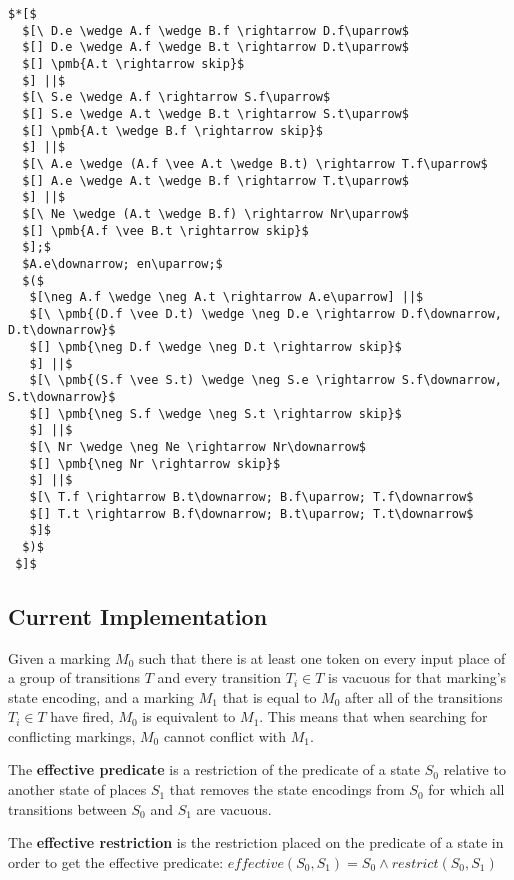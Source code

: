 \begin{lstlisting}[caption={PCFB One Bit Constant Time Accumulator}]
$*[$
  $[\ D.e \wedge A.f \wedge B.f \rightarrow D.f\uparrow$
  $[] D.e \wedge A.f \wedge B.t \rightarrow D.t\uparrow$
  $[] \pmb{A.t \rightarrow skip}$
  $] ||$
  $[\ S.e \wedge A.f \rightarrow S.f\uparrow$
  $[] S.e \wedge A.t \wedge B.t \rightarrow S.t\uparrow$
  $[] \pmb{A.t \wedge B.f \rightarrow skip}$
  $] ||$
  $[\ A.e \wedge (A.f \vee A.t \wedge B.t) \rightarrow T.f\uparrow$
  $[] A.e \wedge A.t \wedge B.f \rightarrow T.t\uparrow$
  $] ||$
  $[\ Ne \wedge (A.t \wedge B.f) \rightarrow Nr\uparrow$
  $[] \pmb{A.f \vee B.t \rightarrow skip}$
  $];$
  $A.e\downarrow; en\uparrow;$
  $($
   $[\neg A.f \wedge \neg A.t \rightarrow A.e\uparrow] ||$
   $[\ \pmb{(D.f \vee D.t) \wedge \neg D.e \rightarrow D.f\downarrow, D.t\downarrow}$
   $[] \pmb{\neg D.f \wedge \neg D.t \rightarrow skip}$
   $] ||$
   $[\ \pmb{(S.f \vee S.t) \wedge \neg S.e \rightarrow S.f\downarrow, S.t\downarrow}$
   $[] \pmb{\neg S.f \wedge \neg S.t \rightarrow skip}$
   $] ||$
   $[\ Nr \wedge \neg Ne \rightarrow Nr\downarrow$
   $[] \pmb{\neg Nr \rightarrow skip}$
   $] ||$
   $[\ T.f \rightarrow B.t\downarrow; B.f\uparrow; T.f\downarrow$
   $[] T.t \rightarrow B.f\downarrow; B.t\uparrow; T.t\downarrow$
   $]$
  $)$
 $]$
\end{lstlisting}

\subsection{Current Implementation}

Given a marking $M_0$ such that there is at least one token on every input place of a group of transitions $T$ and every transition $T_i \in T$ is vacuous for that marking's state encoding, and a marking $M_1$ that is equal to $M_0$ after all of the transitions $T_i \in T$ have fired, $M_0$ is equivalent to $M_1$. This means that when searching for conflicting markings, $M_0$ cannot conflict with $M_1$. 

\begin{definition}
The \textbf{effective predicate} is a restriction of the predicate of a state $S_0$ relative to another state of places $S_1$ that removes the state encodings from $S_0$ for which all transitions between $S_0$ and $S_1$ are vacuous.
\end{definition}

\begin{definition}
The \textbf{effective restriction} is the restriction placed on the predicate of a state in order to get the effective predicate: $effective(S_0, S_1) = S_0 \wedge restrict(S_0, S_1)$
\end{definition}

